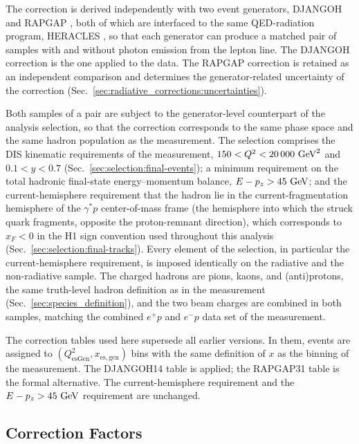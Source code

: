 The correction is derived independently with two event generators, DJANGOH
\cite{Charchula:1994kf} and RAPGAP \cite{Jung:1993gf}, both of which are
interfaced to the same QED-radiation program, HERACLES
\cite{Kwiatkowski:1990es}, so that each generator can produce a matched
pair of samples with and without photon emission from the lepton line.
The DJANGOH correction is the one applied to the data.  The RAPGAP
correction is retained as an independent comparison and determines the
generator-related uncertainty of the correction
(Sec.~\ref{sec:radiative_corrections:uncertainties}).

Both samples of a pair are subject to the generator-level counterpart of
the analysis selection, so that the correction corresponds to the same
phase space and the same hadron population as the measurement.  The
selection comprises the DIS kinematic requirements of the measurement,
$150<Q^{2}<20\,000~\text{GeV}^{2}$ and $0.1<y<0.7$
(Sec.~\ref{sec:selection:final-events}); a minimum requirement on the
total hadronic final-state energy--momentum balance, $E-p_z>45~\text{GeV}$; and
the current-hemisphere requirement that the hadron lie in the
current-fragmentation hemisphere of the $\gamma^{*}p$ center-of-mass
frame (the hemisphere into which the struck quark fragments, opposite
the proton-remnant direction), which corresponds to $x_F<0$ in the H1
sign convention used throughout this analysis
(Sec.~\ref{sec:selection:final-tracks}).  Every element of the selection,
in particular the current-hemisphere requirement, is imposed identically
on the radiative and the non-radiative sample.  The charged hadrons are
pions, kaons, and (anti)protons, the same truth-level hadron definition
as in the measurement (Sec.~\ref{sec:species_definition}), and the two
beam charges are combined in both samples, matching the combined
$e^{+}p$ and $e^{-}p$ data set of the measurement.

The correction tables used here supersede all earlier versions.  In them,
events are assigned to $(Q^2_{\mathrm{esGen}},x_{\mathrm{es,gen}})$ bins with
the same definition of $x$ as the binning of the measurement.  The DJANGOH14
table is applied; the RAPGAP31 table is the formal alternative.  The
current-hemisphere requirement and the $E-p_z>45~\text{GeV}$ requirement are
unchanged.

\subsection{Correction Factors}
\label{sec:radiative_corrections:values}

